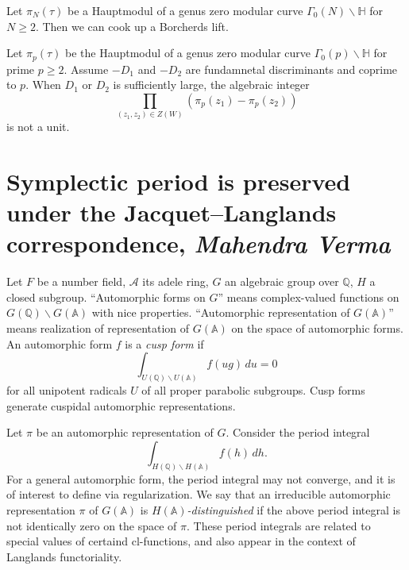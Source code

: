 \documentclass[reqno]{amsart} 
\begin{document}
\begin{theorem}[Ye '22]
  Let $\pi_N(\tau)$ be a Hauptmodul of a genus zero modular curve $\Gamma_0(N) \backslash \mathbb{H}$ for $N \geq 2$.  Then we can cook up a Borcherds lift.
\end{theorem}

\begin{theorem}[M.\ and Y.\ 24]
  Let $\pi_p(\tau)$ be the Hauptmodul of a genus zero modular curve $\Gamma_0(p) \backslash \mathbb{H}$ for prime $p \geq 2$.  Assume $- D_1$ and $- D_2$ are fundamnetal discriminants and coprime to $p$.  When $D_1$ or $D_2$ is sufficiently large, the algebraic integer
  \begin{equation*}
    \prod_{(z_1, z_2) \in Z(W)}
    (\pi_p(z_1) - \pi_p(z_2))
  \end{equation*}
  is not a unit.
\end{theorem}

\section{Symplectic period is preserved under the Jacquet–Langlands correspondence, \textnormal{\emph{Mahendra Verma}}}

Let $F$ be a number field, $\mathcal{A}$ its adele ring, $G$ an algebraic group over $\mathbb{Q}$, $H$ a closed subgroup.  ``Automorphic forms on $G$'' means complex-valued functions on $G(\mathbb{Q}) \backslash G(\mathbb{A})$ with nice properties.  ``Automorphic representation of $G(\mathbb{A})$'' means realization of representation of $G(\mathbb{A})$ on the space of automorphic forms.  An automorphic form $f$ is a \emph{cusp form} if
\begin{equation*}
  \int_{U(\mathbb{Q}) \backslash U(\mathbb{A})}
  f(u g) \, d u = 0
\end{equation*}
for all unipotent radicals $U$ of all proper parabolic subgroups.  Cusp forms generate cuspidal automorphic representations.

Let $\pi$ be an automorphic representation of $G$.  Consider the period integral
\begin{equation*}
  \int_{H(\mathbb{Q}) \backslash H(\mathbb{A})} f(h) \, d h.
\end{equation*}
For a general automorphic form, the period integral may not converge, and it is of interest to define via regularization.  We say that an irreducible automorphic representation $\pi$ of $G(\mathbb{A})$ is $H(\mathbb{A})$\emph{-distinguished} if the above period integral is not identically zero on the space of $\pi$.  These period integrals are related to special values of certaind cl-functions, and also appear in the context of Langlands functoriality.
\end{document}
